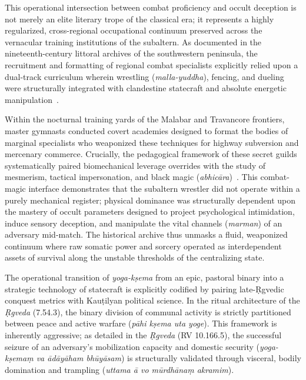 \documentclass[11pt,twoside,letterpaper]{article}
\begin{document}
This operational intersection between combat proficiency and occult deception is not merely an elite literary trope of the classical era; it represents a highly regularized, cross-regional occupational continuum preserved across the vernacular training institutions of the subaltern. As documented in the nineteenth-century littoral archives of the southwestern peninsula, the recruitment and formatting of regional combat specialists explicitly relied upon a dual-track curriculum wherein wrestling (\textit{malla-yuddha}), fencing, and dueling were structurally integrated with clandestine statecraft and absolute energetic manipulation~\cite{vilanilam1971}. 

Within the nocturnal training yards of the Malabar and Travancore frontiers, master gymnasts conducted covert academies designed to format the bodies of marginal specialists who weaponized these techniques for highway subversion and mercenary commerce. Crucially, the pedagogical framework of these secret guilds systematically paired biomechanical leverage overrides with the study of mesmerism, tactical impersonation, and black magic (\textit{abhicāra})~\cite{vilanilam1971}. This combat-magic interface demonstrates that the subaltern wrestler did not operate within a purely mechanical register; physical dominance was structurally dependent upon the mastery of occult parameters designed to project psychological intimidation, induce sensory deception, and manipulate the vital channels (\textit{marman}) of an adversary mid-match. The historical archive thus unmasks a fluid, weaponized continuum where raw somatic power and sorcery operated as interdependent assets of survival along the unstable thresholds of the centralizing state.

The operational transition of \textit{yoga-kṣema} from an epic, pastoral binary into a strategic technology of statecraft is explicitly codified by pairing late-Ṛgvedic conquest metrics with Kauṭilyan political science. In the ritual architecture of the \textit{Ṛgveda} (7.54.3), the binary division of communal activity is strictly partitioned between peace and active warfare (\textit{pāhi kṣema uta yoge}). This framework is inherently aggressive; as detailed in the \textit{Ṛgveda} (RV 10.166.5), the successful seizure of an adversary’s mobilization capacity and domestic security (\textit{yoga-kṣemaṃ va ādāyāham bhūyāsam}) is structurally validated through visceral, bodily domination and trampling (\textit{uttama ā vo mūrdhānaṃ akramim}). 
\end{document}
